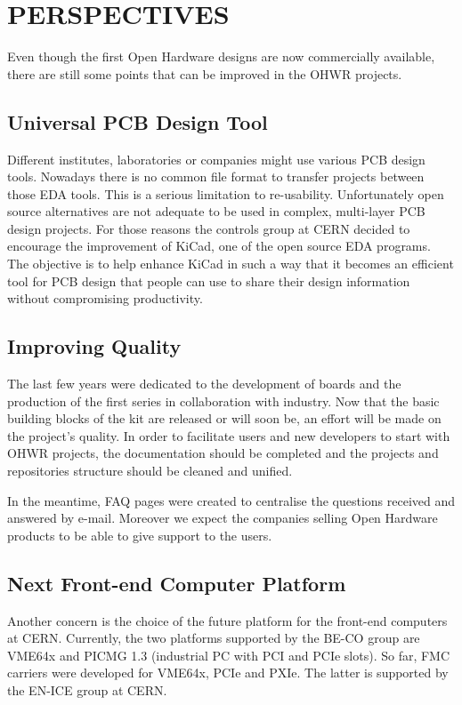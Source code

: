 \documentclass{JAC2003}
\begin{document}
\section{PERSPECTIVES}
Even though the first Open Hardware designs are now commercially available, there are still some points that can be improved in the OHWR projects.

\subsection{Universal PCB Design Tool}
Different institutes, laboratories or companies might use various PCB design tools.
Nowadays there is no common file format to transfer projects between those EDA tools.
This is a serious limitation to re-usability.
Unfortunately open source alternatives are not adequate to be used in complex, multi-layer PCB design projects.
For those reasons the controls group at CERN decided to encourage the improvement of KiCad, one of the open source EDA programs.
The objective is to help enhance KiCad in such a way that it becomes an efficient tool for PCB design that people can use to share their design information without compromising productivity.

\subsection{Improving Quality}
The last few years were dedicated to the development of boards and the production of the first series in collaboration with industry.
Now that the basic building blocks of the kit are released or will soon be, an effort will be made on the project's quality.
In order to facilitate users and new developers to start with OHWR projects, the documentation should be completed and the projects and repositories structure should be cleaned and unified.

In the meantime, FAQ pages were created to centralise the questions received and answered by e-mail.
Moreover we expect the companies selling Open Hardware products to be able to give support to the users.

\subsection{Next Front-end Computer Platform}
Another concern is the choice of the future platform for the front-end computers at CERN.
Currently, the two platforms supported by the BE-CO group are VME64x and PICMG 1.3 (industrial PC with PCI and PCIe slots).
So far, FMC carriers were developed for VME64x, PCIe and PXIe.
The latter is supported by the EN-ICE group at CERN.
\end{document}
